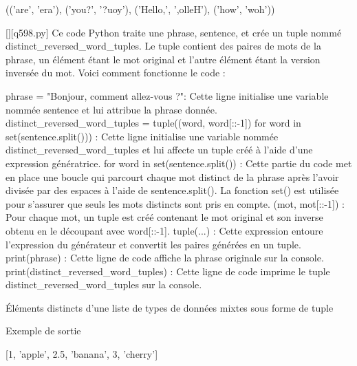 (('are', 'era'), ('you?', '?uoy'), ('Hello,', ',olleH'), ('how', 'woh'))
        \par
        \begin{solution}
            \renewcommand{\nomfichier}{q598.py}
            \pythonfile{\chemincode \nomfichier}[][\nomfichier]
            Ce code Python traite une phrase, sentence, et crée un tuple nommé distinct_reversed_word_tuples. Le tuple contient des paires de mots de la phrase, un élément étant le mot original et l'autre élément étant la version inversée du mot. Voici comment fonctionne le code :

    phrase = "Bonjour, comment allez-vous ?": Cette ligne initialise une variable nommée sentence et lui attribue la phrase donnée.
    distinct_reversed_word_tuples = tuple((word, word[::-1]) for word in set(sentence.split())) : Cette ligne initialise une variable nommée distinct_reversed_word_tuples et lui affecte un tuple créé à l'aide d'une expression génératrice.
        for word in set(sentence.split()) : Cette partie du code met en place une boucle qui parcourt chaque mot distinct de la phrase après l'avoir divisée par des espaces à l'aide de sentence.split(). La fonction set() est utilisée pour s'assurer que seuls les mots distincts sont pris en compte.
        (mot, mot[::-1]) : Pour chaque mot, un tuple est créé contenant le mot original et son inverse obtenu en le découpant avec word[::-1].
        tuple(...) : Cette expression entoure l'expression du générateur et convertit les paires générées en un tuple.
    print(phrase) : Cette ligne de code affiche la phrase originale sur la console.
    print(distinct_reversed_word_tuples) : Cette ligne de code imprime le tuple distinct_reversed_word_tuples sur la console.
        \end{solution}
        

        \question
        Éléments distincts d'une liste de types de données mixtes sous forme de tuple

Exemple de sortie

[1, 'apple', 2.5, 'banana', 3, 'cherry']

